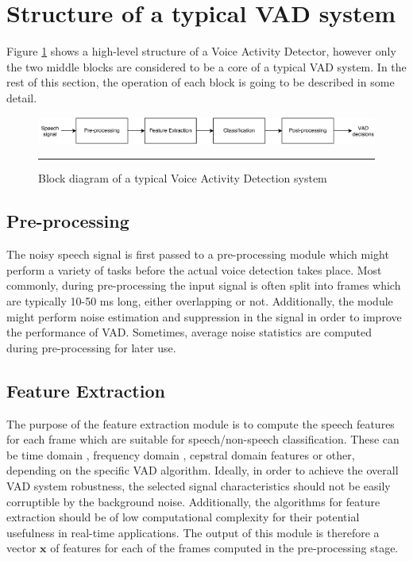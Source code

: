 
\section{Structure of a typical VAD system}

Figure \ref{fig:VADStructure} shows a high-level structure of a Voice Activity Detector, however only the two middle blocks are considered to be a core of a typical VAD system. In the rest of this section, the operation of each block is going to be described in some detail. \bigskip

\begin{figure}[htbp]
	\centering
		\includegraphics[width=1.0\columnwidth]{Figures/Chapter1/VADStructure.png}
		\rule{37em}{0.5pt}
	\caption[Block diagram of a typical Voice Activity Detection system]{Block diagram of a typical Voice Activity Detection system}
	\label{fig:VADStructure}
\end{figure}

\subsection{Pre-processing}

The noisy speech signal is first passed to a pre-processing module which might perform a variety of tasks before the actual voice detection takes place. Most commonly, during pre-processing the input signal is often split into frames which are typically 10-50 ms long, either overlapping or not. Additionally, the module might perform noise estimation and suppression in the signal in order to improve the performance of VAD. Sometimes, average noise statistics are computed during pre-processing for later use.

\subsection{Feature Extraction}

The purpose of the feature extraction module is to compute the speech features for each frame which are suitable for speech/non-speech classification. These can be time domain \cite{Kida, Weaver}, frequency domain \cite{Tuske, LTSD, Tan, PARADE, RamirezMulti, Sohn, SohnInitial, Renevey}, cepstral domain \cite{Kotcher} features or other, depending on the specific VAD algorithm. Ideally, in order to achieve the overall VAD system robustness, the selected signal characteristics should not be easily corruptible by the background noise. Additionally, the algorithms for feature extraction should be of low computational complexity for their potential usefulness in real-time applications. The output of this module is therefore a vector $\mathbf{x}$ of features for each of the frames computed in the pre-processing stage.

